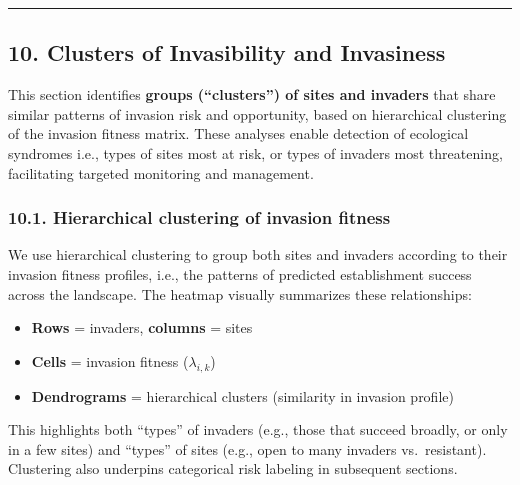 \documentclass[
]{article}
\providecommand{\tightlist}{%
  \setlength{\itemsep}{0pt}\setlength{\parskip}{0pt}}
\begin{document}
\begin{center}\rule{0.5\linewidth}{0.5pt}\end{center}

\hypertarget{clusters-of-invasibility-and-invasiness}{%
\subsection{10. Clusters of Invasibility and
Invasiness}\label{clusters-of-invasibility-and-invasiness}}

This section identifies \textbf{groups (``clusters'') of sites and
invaders} that share similar patterns of invasion risk and opportunity,
based on hierarchical clustering of the invasion fitness matrix. These
analyses enable detection of ecological syndromes i.e., types of sites
most at risk, or types of invaders most threatening, facilitating
targeted monitoring and management.

\hypertarget{hierarchical-clustering-of-invasion-fitness}{%
\subsubsection{10.1. Hierarchical clustering of invasion
fitness}\label{hierarchical-clustering-of-invasion-fitness}}

We use hierarchical clustering to group both sites and invaders
according to their invasion fitness profiles, i.e., the patterns of
predicted establishment success across the landscape. The heatmap
visually summarizes these relationships:

\begin{itemize}
\tightlist
\item
  \textbf{Rows} = invaders, \textbf{columns} = sites\\
\item
  \textbf{Cells} = invasion fitness (\(\lambda_{i,k}\))\\
\item
  \textbf{Dendrograms} = hierarchical clusters (similarity in invasion
  profile)
\end{itemize}

This highlights both ``types'' of invaders (e.g., those that succeed
broadly, or only in a few sites) and ``types'' of sites (e.g., open to
many invaders vs.~resistant). Clustering also underpins categorical risk
labeling in subsequent sections.
\end{document}
